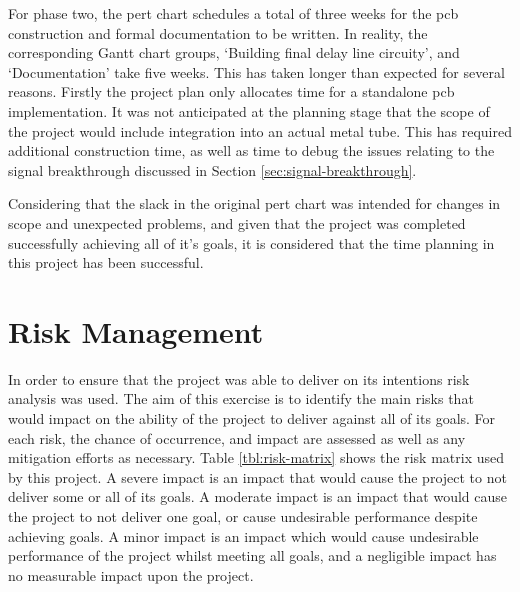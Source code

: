 For phase two, the \gls{pert} chart schedules a total of three weeks for the \gls{pcb} construction and formal documentation to be written. In reality, the corresponding Gantt chart groups, `Building final delay line circuity', and `Documentation' take five weeks. This has taken longer than expected for several reasons. Firstly the project plan only allocates time for a standalone \gls{pcb} implementation. It was not anticipated at the planning stage that the scope of the project would include integration into an actual metal tube. This has required additional construction time, as well as time to debug the issues relating to the signal breakthrough discussed in Section \ref{sec:signal-breakthrough}.

Considering that the slack in the original \gls{pert} chart was intended for changes in scope and unexpected problems, and given that the project was completed successfully achieving all of it's goals, it is considered that the time planning in this project has been successful.

\section{Risk Management}

In order to ensure that the project was able to deliver on its intentions risk analysis was used. The aim of this exercise is to identify the main risks that would impact on the ability of the project to deliver against all of its goals. For each risk, the chance of occurrence, and impact are assessed as well as any mitigation efforts as necessary. Table \ref{tbl:risk-matrix} shows the risk matrix used by this project. A severe impact is an impact that would cause the project to not deliver some or all of its goals. A moderate impact is an impact that would cause the project to not deliver one goal, or cause undesirable performance despite achieving goals. A minor impact is an impact which would cause undesirable performance of the project whilst meeting all goals, and a negligible impact has no measurable impact upon the project.


